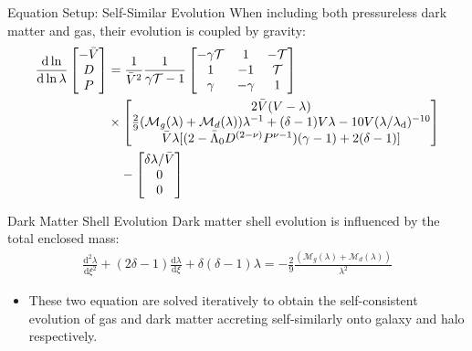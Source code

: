 \documentclass[11pt]{beamer}
\begin{document}
\begin{frame}{Equation Setup: Self-Similar Evolution}
When including both pressureless dark matter and gas, their evolution is coupled by gravity:
\begin{align*}
\frac{\mathrm{d} \ln}{\mathrm{d} \ln \lambda}
\begin{bmatrix}
    -\bar{V}\\
    D\\
    P
\end{bmatrix} &= \frac{1}{\bar{V}^2} \frac{1}{\gamma \mathcal{T}-1}
\begin{bmatrix}
-\gamma \mathcal{T} & 1 & -\mathcal{T}\\
1 & -1 & \mathcal{T}\\
\gamma & -\gamma & 1
\end{bmatrix} \\
& \times \begin{bmatrix}
    2 \bar{V} (V-\lambda) \\
\frac{2}{9} (\mathcal{M}_g(\lambda)+\mathcal{M}_d(\lambda)) \lambda^{-1} + (\delta -1 ) V \lambda - 10V(\lambda/\lambda_{\rm d})^{-10} \\
    \bar{V} \lambda [(2-\Bar{\Lambda}_0 D^{(2-\nu)} P^{\nu-1})(\gamma - 1) + 2(\delta -1)]
\end{bmatrix} \\ & \quad-
\begin{bmatrix}
\delta \lambda/ \bar{V}\\
0\\
0\\
\end{bmatrix}
\end{align*}
\end{frame}
    
\begin{frame}{Dark Matter Shell Evolution}
Dark matter shell evolution is influenced by the total enclosed mass:
\begin{align}
\frac{\mathrm{d}^2 \lambda}{\mathrm{d} \xi^2} + (2 \delta - 1) \frac{\mathrm{d} \lambda}{\mathrm{d}  \xi} + \delta ( \delta -1) \lambda = - \frac{2}{9} \frac{(\mathcal{M}_g(\lambda)+\mathcal{M}_d(\lambda))}{\lambda^2 }
\end{align}
\vspace{5pt}
\begin{itemize}
    \item These two equation are solved iteratively to obtain the self-consistent evolution of gas and dark matter accreting self-similarly onto galaxy and halo respectively.
\end{itemize}
\end{frame}
\end{document}
